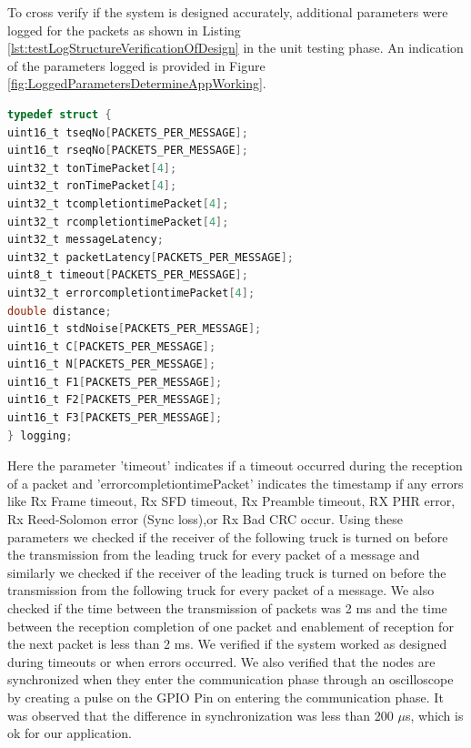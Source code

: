 To cross verify if the system is designed accurately, additional parameters were logged for the packets as shown in Listing \ref{lst:testLogStructureVerificationOfDesign} in the unit testing phase. An indication of the parameters logged is provided in Figure \ref{fig:LoggedParametersDetermineAppWorking}. 
\begin{lstlisting}[caption={Test Log structure for verification of design}, label={lst:testLogStructureVerificationOfDesign}, language=C]
typedef struct {
uint16_t tseqNo[PACKETS_PER_MESSAGE];
uint16_t rseqNo[PACKETS_PER_MESSAGE];
uint32_t tonTimePacket[4];
uint32_t ronTimePacket[4];
uint32_t tcompletiontimePacket[4];
uint32_t rcompletiontimePacket[4];
uint32_t messageLatency;
uint32_t packetLatency[PACKETS_PER_MESSAGE];
uint8_t timeout[PACKETS_PER_MESSAGE];
uint32_t errorcompletiontimePacket[4];
double distance;
uint16_t stdNoise[PACKETS_PER_MESSAGE];
uint16_t C[PACKETS_PER_MESSAGE];
uint16_t N[PACKETS_PER_MESSAGE];
uint16_t F1[PACKETS_PER_MESSAGE];
uint16_t F2[PACKETS_PER_MESSAGE];
uint16_t F3[PACKETS_PER_MESSAGE];
} logging;
\end{lstlisting}
Here the parameter 'timeout' indicates if a timeout occurred during the reception of a packet and 'errorcompletiontimePacket' indicates the timestamp if any errors like Rx Frame timeout, Rx SFD timeout, Rx Preamble timeout, RX PHR error, Rx Reed-Solomon error (Sync loss),or Rx Bad CRC occur. Using these parameters we checked if the receiver of the following truck is turned on before the transmission from the leading truck for every packet of a message and similarly we checked if the receiver of the leading truck is turned on before the transmission from the following truck for every packet of a message. We also checked if the time between the transmission of packets was 2 ms and the time between the reception completion of one packet and enablement of reception for the next packet is less than 2 ms. We verified if the system worked as designed during timeouts or when errors occurred. We also verified that the nodes are synchronized when they enter the communication phase through an oscilloscope by creating a pulse on the GPIO Pin on entering the communication phase. It was observed that the difference in synchronization was less than 200 $\mu$s, which is ok for our application.


